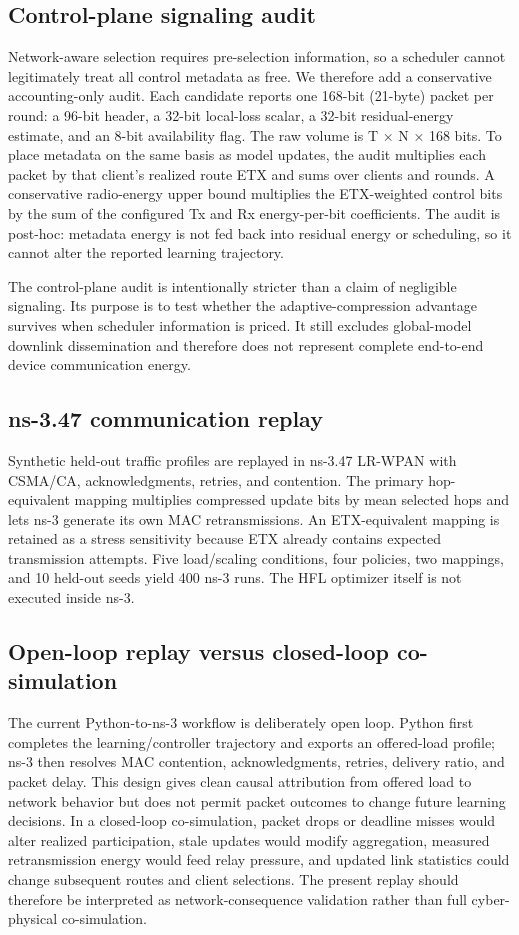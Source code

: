 \documentclass[11pt]{article}
\begin{document}
\subsection*{Control-plane signaling audit}
Network-aware selection requires pre-selection information, so a scheduler cannot legitimately treat all control metadata as free. We therefore add a conservative accounting-only audit. Each candidate reports one 168-bit (21-byte) packet per round: a 96-bit header, a 32-bit local-loss scalar, a 32-bit residual-energy estimate, and an 8-bit availability flag. The raw volume is T × N × 168 bits. To place metadata on the same basis as model updates, the audit multiplies each packet by that client's realized route ETX and sums over clients and rounds. A conservative radio-energy upper bound multiplies the ETX-weighted control bits by the sum of the configured Tx and Rx energy-per-bit coefficients. The audit is post-hoc: metadata energy is not fed back into residual energy or scheduling, so it cannot alter the reported learning trajectory.\par
The control-plane audit is intentionally stricter than a claim of negligible signaling. Its purpose is to test whether the adaptive-compression advantage survives when scheduler information is priced. It still excludes global-model downlink dissemination and therefore does not represent complete end-to-end device communication energy.\par
\subsection*{ns-3.47 communication replay}
Synthetic held-out traffic profiles are replayed in ns-3.47 LR-WPAN with CSMA/CA, acknowledgments, retries, and contention. The primary hop-equivalent mapping multiplies compressed update bits by mean selected hops and lets ns-3 generate its own MAC retransmissions. An ETX-equivalent mapping is retained as a stress sensitivity because ETX already contains expected transmission attempts. Five load/scaling conditions, four policies, two mappings, and 10 held-out seeds yield 400 ns-3 runs. The HFL optimizer itself is not executed inside ns-3.\par
\subsection*{Open-loop replay versus closed-loop co-simulation}
The current Python-to-ns-3 workflow is deliberately open loop. Python first completes the learning/controller trajectory and exports an offered-load profile; ns-3 then resolves MAC contention, acknowledgments, retries, delivery ratio, and packet delay. This design gives clean causal attribution from offered load to network behavior but does not permit packet outcomes to change future learning decisions. In a closed-loop co-simulation, packet drops or deadline misses would alter realized participation, stale updates would modify aggregation, measured retransmission energy would feed relay pressure, and updated link statistics could change subsequent routes and client selections. The present replay should therefore be interpreted as network-consequence validation rather than full cyber-physical co-simulation.\par
\end{document}
